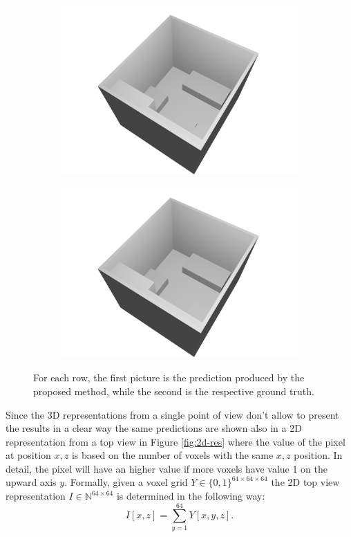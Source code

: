 \documentclass[binding=0.6cm,noexaminfo]{sapthesis}
\begin{document}
\begin{figure}[h!]
\begin{subfigure}{.49\textwidth}
	\centering
	\includegraphics[width=.90\linewidth]{results/pred_3}
	\caption{}
\end{subfigure}
\begin{subfigure}{.49\textwidth}
	\centering
	\includegraphics[width=.90\linewidth]{results/true_3}
	\caption{}
\end{subfigure}

\caption{For each row, the first picture is the prediction produced by the proposed method, while the second is the respective ground truth.}
\label{fig:3d-res}
\end{figure}

Since the 3D representations from a single point of view don't allow to present the results in a clear way the same predictions are shown also in a 2D representation from a top view in Figure \ref{fig:2d-res} where the value of the pixel at position $x,z$ is based on the number of voxels with the same $x,z$ position. In detail, the pixel will have an higher value if more voxels have value 1 on the upward axis $y$. Formally, given a voxel grid $Y \in \{0, 1\}^{64 \times 64 \times 64}$ the 2D top view representation $I \in \mathbb{N}^{64 \times 64}$ is determined in the following way:
\begin{equation}
I[x, z] = \sum_{y = 1}^{64} Y[x, y, z].
\end{equation}
\end{document}
